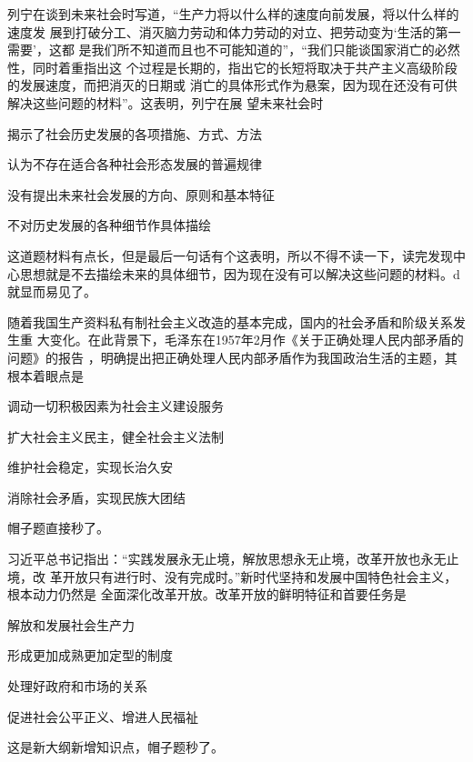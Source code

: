 \documentclass[lang=cn,newtx,10pt,scheme=chinese,pad,twocol]{zznote}
\begin{document}
\begin{exercise}列宁在谈到未来社会时写道，“生产力将以什么样的速度向前发展，将以什么样的速度发 展到打破分工、消灭脑力劳动和体力劳动的对立、把劳动变为‘生活的第一 需要’，这都 是我们所不知道而且也不可能知道的”，“我们只能谈国家消亡的必然性，同时着重指出这 个过程是长期的，指出它的长短将取决于共产主义高级阶段的发展速度，而把消灭的日期或 消亡的具体形式作为悬案，因为现在还没有可供解决这些问题的材料”。这表明，列宁在展 望未来社会时
	\begin{choice}
		\item 揭示了社会历史发展的各项措施、方式、方法
		\item 认为不存在适合各种社会形态发展的普遍规律
		\item 没有提出未来社会发展的方向、原则和基本特征
		\item 不对历史发展的各种细节作具体描绘
	\end{choice}
\end{exercise}
\begin{solution}
	​这道题材料有点长，但是最后一句话有个这表明，所以不得不读一下，读完发现中心思想就是不去描绘未来的具体细节，因为现在没有可以解决这些问题的材料。d就显而易见了。
\end{solution}


\begin{exercise}随着我国生产资料私有制社会主义改造的基本完成，国内的社会矛盾和阶级关系发 生重 大变化。在此背景下，毛泽东在1957年2月作《关于正确处理人民内部矛盾的问题》的报告 ，明确提出把正确处理人民内部矛盾作为我国政治生活的主题，其根本着眼点是
	\begin{choice}
		\item 调动一切积极因素为社会主义建设服务
		\item 扩大社会主义民主，健全社会主义法制
		\item 维护社会稳定，实现长治久安
		\item 消除社会矛盾，实现民族大团结
	\end{choice}
\end{exercise}
\begin{solution}
	帽子题直接秒了。
\end{solution}


\begin{exercise} 习近平总书记指出：“实践发展永无止境，解放思想永无止境，改革开放也永无止境，改 革开放只有进行时、没有完成时。”新时代坚持和发展中国特色社会主义，根本动力仍然是 全面深化改革开放。改革开放的鲜明特征和首要任务是
	\begin{choice}
		\item 解放和发展社会生产力
		\item 形成更加成熟更加定型的制度
		\item 处理好政府和市场的关系
		\item 促进社会公平正义、增进人民福祉
	\end{choice}
\end{exercise}
\begin{solution}
	这是新大纲新增知识点，帽子题秒了。
\end{solution}
\end{document}
